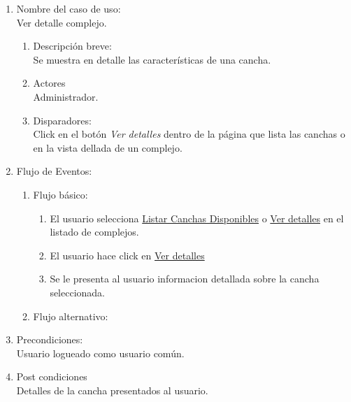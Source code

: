 \documentclass[a4paper,11pt]{article}
\begin{document}
\begin{enumerate}

    \item Nombre del caso de uso: \\
    Ver detalle complejo.

    \begin{enumerate}
    \item Descripción breve: \\
        Se muestra en detalle las características de una cancha.
    \item Actores \\
        Administrador.
    \item Disparadores: \\
        Click en el botón \emph{Ver detalles} dentro de la
        página que lista las canchas o en la vista dellada de un complejo.
    \end{enumerate}

    \item Flujo de Eventos: \\

    \begin{enumerate}

        \item Flujo básico:\\
	\begin{enumerate}
                    \item El usuario selecciona \underline{Listar Canchas Disponibles} o \underline{Ver detalles} en el listado de complejos.
                    \item El usuario hace click en \underline{Ver detalles}
		    \item Se le presenta al usuario informacion detallada sobre la cancha seleccionada.
        \end{enumerate}
	\item Flujo alternativo:\\
    \end{enumerate}

    \item Precondiciones: \\
        Usuario logueado como usuario común.

    \item Post condiciones \\
        Detalles de la cancha presentados al usuario.

\end{enumerate}
\end{document}
